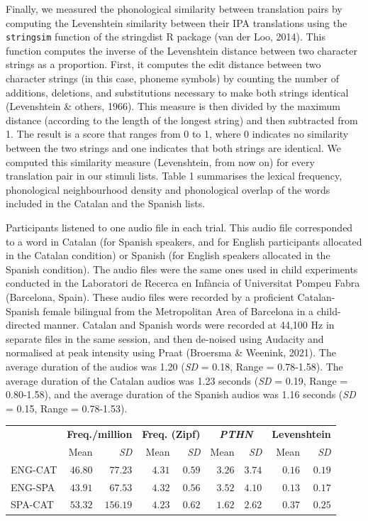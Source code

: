 \documentclass[
  english,
  man,floatsintext]{apa6}
\begin{document}
Finally, we measured the phonological similarity between translation pairs by computing the Levenshtein similarity between their IPA translations using the \texttt{stringsim} function of the stringdist R package (van der Loo, 2014). This function computes the inverse of the Levenshtein distance between two character strings as a proportion. First, it computes the edit distance between two character strings (in this case, phoneme symbols) by counting the number of additions, deletions, and substitutions necessary to make both strings identical (Levenshtein \& others, 1966). This measure is then divided by the maximum distance (according to the length of the longest string) and then subtracted from 1. The result is a score that ranges from 0 to 1, where 0 indicates no similarity between the two strings and one indicates that both strings are identical. We computed this similarity measure (Levenshtein, from now on) for every translation pair in our stimuli lists. Table 1 summarises the lexical frequency, phonological neighbourhood density and phonological overlap of the words included in the Catalan and the Spanish lists.

Participants listened to one audio file in each trial. This audio file corresponded to a word in Catalan (for Spanish speakers, and for English participants allocated in the Catalan condition) or Spanish (for English speakers allocated in the Spanish condition). The audio files were the same ones used in child experiments conducted in the Laboratori de Recerca en Infància of Universitat Pompeu Fabra (Barcelona, Spain). These audio files were recorded by a proficient Catalan-Spanish female bilingual from the Metropolitan Area of Barcelona in a child-directed manner. Catalan and Spanish words were recorded at 44,100 Hz in separate files in the same session, and then de-noised using Audacity and normalised at peak intensity using Praat (Broersma \& Weenink, 2021). The average duration of the audios was 1.20 (\emph{SD} = 0.18, Range = 0.78-1.58). The average duration of the Catalan audios was 1.23 seconds (\emph{SD} = 0.19, Range = 0.80-1.58), and the average duration of the Spanish audios was 1.16 seconds (\emph{SD} = 0.15, Range = 0.78-1.53).

\captionsetup[table]{labelformat=empty,skip=1pt}
\begin{longtable}{lrrrrrrrr}
\toprule
 & \multicolumn{2}{c}{\textbf{Freq./million}} & \multicolumn{2}{c}{\textbf{Freq. (Zipf)}} & \multicolumn{2}{c}{\emph{\textbf{PTHN}}} & \multicolumn{2}{c}{\textbf{Levenshtein}} \\ 
 \cmidrule(lr){2-3} \cmidrule(lr){4-5} \cmidrule(lr){6-7} \cmidrule(lr){8-9}
 & Mean & \emph{SD} & Mean & \emph{SD} & Mean & \emph{SD} & Mean & \emph{SD} \\ 
\midrule
ENG-CAT & $46.80$ & $77.23$ & $4.31$ & $0.59$ & $3.26$ & $3.74$ & $0.16$ & $0.19$ \\ 
ENG-SPA & $43.91$ & $67.53$ & $4.32$ & $0.56$ & $3.52$ & $4.10$ & $0.13$ & $0.17$ \\ 
SPA-CAT & $53.32$ & $156.19$ & $4.23$ & $0.62$ & $1.62$ & $2.62$ & $0.37$ & $0.25$ \\ 
 \bottomrule
\end{longtable}
\end{document}

